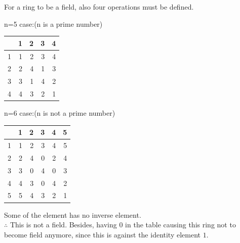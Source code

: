 \documentclass[12pt,fleqn]{article}
\begin{document}
\begin{enumerate}
For a ring to be a field, also four operations must be defined.



n=5 case:(n is a prime number)

    \begin{tabular}{|r|r|r|r|r|}
    \hline
     & 1 & 2 & 3 & 4\\
    \hline
    1 & 1 & 2 & 3 & 4\\
    \hline
    2 & 2 & 4 & 1 & 3\\
    \hline
    3 & 3 & 1 & 4 & 2\\
    \hline
    4 & 4 & 3 & 2 & 1\\
    \hline
    \end{tabular}

n=6 case:(n is not a prime number)
      
    \begin{tabular}{|r|r|r|r|r|r|}
    \hline
     & 1 & 2 & 3 & 4 & 5\\
    \hline
    1 & 1 & 2 & 3 & 4 & 5\\
    \hline
    2 & 2 & 4 & 0 & 2 & 4\\
    \hline
    3 & 3 & 0 & 4 & 0 & 3\\
    \hline
    4 & 4 & 3 & 0 & 4 & 2\\
    \hline
    5 & 5 & 4 & 3 & 2 & 1\\
    \hline
    \end{tabular}  

Some of the element has no inverse element.\\
$ \therefore $  This is not a field.
Besides, having $0$ in the table causing this ring not to become field anymore, since
this is against the identity element $1$.


\end{enumerate}
\end{document}
